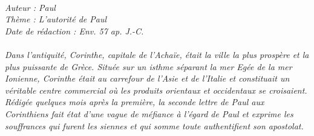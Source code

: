 \BFont
\noindent\hrulefill
{\footnotesize
\textit{
\bigskip
{\centering{}
\\Auteur : Paul
\\Thème : L'autorité de Paul
\\Date de rédaction : Env. 57 ap. J.-C.\\}
}
\textit{
\\Dans l'antiquité, Corinthe, capitale de l'Achaïe, était la ville la plus prospère et la plus puissante de Grèce. Située sur un isthme séparant la mer Egée de la mer Ionienne, Corinthe était au carrefour de l'Asie et de l'Italie et constituait un véritable centre commercial où les produits orientaux et occidentaux se croisaient.
\\Rédigée quelques mois après la première, la seconde lettre de Paul aux Corinthiens fait état d'une vague de méfiance à l'égard de Paul et exprime les souffrances qui furent les siennes et qui somme toute authentifient son apostolat.\bigskip
}
}
\par\nobreak\noindent\hrulefill
